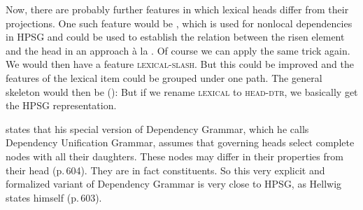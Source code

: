 Now, there are probably further features in which lexical heads differ from their projections. 
One such feature
would be \slasch, which is used for nonlocal dependencies in HPSG and could be used to establish the
relation between the risen element and the head in an approach à la \citet{GO2009a}. Of course we can apply the same trick again. We
would then have a feature \textsc{lexical-slash}. But this could be improved and the features of the
lexical item could be grouped under one path. The general skeleton would then be ():
\ea
{}
\z
But if we rename \textsc{lexical} to \textsc{head-dtr}, we basically get the HPSG
representation. 

\citet[]{Hellwig2003a} states that his special version of Dependency Grammar,
which he calls Dependency Unification Grammar, assumes that
governing heads select complete nodes with all their daughters. These nodes may differ in their
properties from their head (p.\,604). They are in fact constituents. So this very explicit and
formalized variant of Dependency Grammar is very close to HPSG, as Hellwig states himself (p.\,603).

